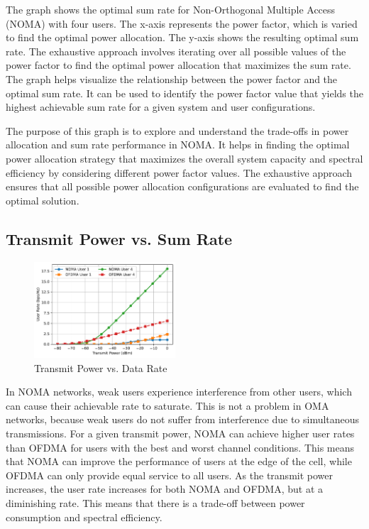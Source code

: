\documentclass[conference]{IEEEtran}
\begin{document}
The graph shows the optimal sum rate for Non-Orthogonal Multiple Access (NOMA) with four users. The x-axis represents the power factor, which is varied to find the optimal power allocation. The y-axis shows the resulting optimal sum rate. The exhaustive approach involves iterating over all possible values of the power factor to find the optimal power allocation that maximizes the sum rate. The graph helps visualize the relationship between the power factor and the optimal sum rate. It can be used to identify the power factor value that yields the highest achievable sum rate for a given system and user configurations.

The purpose of this graph is to explore and understand the trade-offs in power allocation and sum rate performance in NOMA. It helps in finding the optimal power allocation strategy that maximizes the overall system capacity and spectral efficiency by considering different power factor values. The exhaustive approach ensures that all possible power allocation configurations are evaluated to find the optimal solution.

\subsection{Transmit Power vs. Sum Rate}

\begin{figure}[t!]
    \centering
    \includegraphics[width=0.47\textwidth, height= 0.35\textwidth]{figures/individual_user_rates.pdf}
    \caption{Transmit Power vs. Data Rate}
\end{figure}

In NOMA networks, weak users experience interference from other users, which can cause their achievable rate to saturate. This is not a problem in OMA networks, because weak users do not suffer from interference due to simultaneous transmissions. For a given transmit power, NOMA can achieve higher user rates than OFDMA for users with the best and worst channel conditions. This means that NOMA can improve the performance of users at the edge of the cell, while OFDMA can only provide equal service to all users. As the transmit power increases, the user rate increases for both NOMA and OFDMA, but at a diminishing rate. This means that there is a trade-off between power consumption and spectral efficiency.
\end{document}
